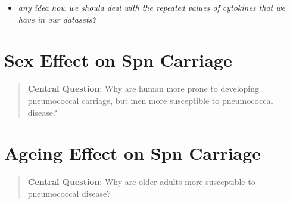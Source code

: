 \documentclass[
]{book}
\providecommand{\tightlist}{%
  \setlength{\itemsep}{0pt}\setlength{\parskip}{0pt}}
\begin{document}
\begin{itemize}
\tightlist
\item
  \emph{any idea how we should deal with the repeated values of cytokines that we have in our datasets?}
\end{itemize}

\hypertarget{sex-effect-on-spn-carriage}{%
\section{Sex Effect on Spn Carriage}\label{sex-effect-on-spn-carriage}}

\begin{quote}
\textbf{Central Question}: Why are human more prone to developing pneumococcal carriage, but men more susceptible to pneumococcal disease?
\end{quote}

\hypertarget{ageing-effect-on-spn-carriage}{%
\section{Ageing Effect on Spn Carriage}\label{ageing-effect-on-spn-carriage}}

\begin{quote}
\textbf{Central Question}: Why are older adults more susceptible to pneumococcal disease?
\end{quote}
\end{document}
